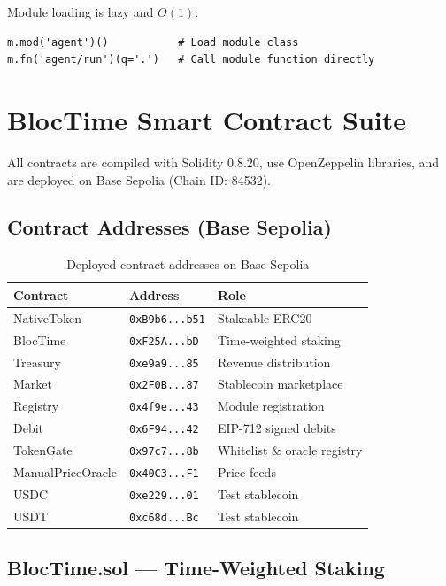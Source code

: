\documentclass[11pt,a4paper]{article}
\begin{document}
Module loading is lazy and $O(1)$:

\begin{lstlisting}[style=python]
m.mod('agent')()           # Load module class
m.fn('agent/run')(q='.')   # Call module function directly
\end{lstlisting}

\section{BlocTime Smart Contract Suite}
\label{sec:contracts}

All contracts are compiled with Solidity 0.8.20, use OpenZeppelin libraries, and are deployed on Base Sepolia (Chain ID: 84532).

\subsection{Contract Addresses (Base Sepolia)}

\begin{table}[H]
\centering
\begin{tabularx}{\textwidth}{llX}
\toprule
\textbf{Contract} & \textbf{Address} & \textbf{Role} \\
\midrule
NativeToken & \texttt{0xB9b6...b51} & Stakeable ERC20 \\
BlocTime & \texttt{0xF25A...bD} & Time-weighted staking \\
Treasury & \texttt{0xe9a9...85} & Revenue distribution \\
Market & \texttt{0x2F0B...87} & Stablecoin marketplace \\
Registry & \texttt{0x4f9e...43} & Module registration \\
Debit & \texttt{0x6F94...42} & EIP-712 signed debits \\
TokenGate & \texttt{0x97c7...8b} & Whitelist \& oracle registry \\
ManualPriceOracle & \texttt{0x40C3...F1} & Price feeds \\
USDC & \texttt{0xe229...01} & Test stablecoin \\
USDT & \texttt{0xc68d...Bc} & Test stablecoin \\
\bottomrule
\end{tabularx}
\caption{Deployed contract addresses on Base Sepolia}
\end{table}

\subsection{BlocTime.sol --- Time-Weighted Staking}
\end{document}
